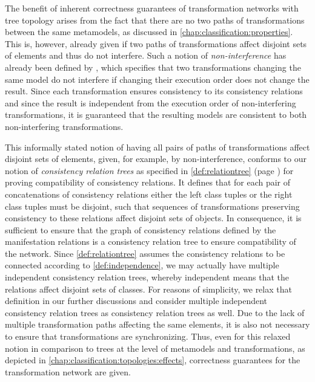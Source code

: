 The benefit of inherent correctness guarantees of transformation networks with tree topology arises from the fact that there are no two paths of transformations between the same metamodels, as discussed in \autoref{chap:classification:properties}.
This is, however, already given if two paths of transformations affect disjoint sets of elements and thus do not interfere.
Such a notion of \emph{non-interference} has already been defined by \textcite{stevens2020BidirectionalTransformationLarge-SoSym}, which specifies that two transformations changing the same model do not interfere if changing their execution order does not change the result.
Since each transformation ensures consistency to its consistency relations and since the result is independent from the execution order of non-interfering transformations, it is guaranteed that the resulting models are consistent to both non-interfering transformations.

This informally stated notion of having all pairs of paths of transformations affect disjoint sets of elements, given, for example, by non-interference, conforms to our notion of \emph{consistency relation trees} as specified in \autoref{def:relationtree} (page \pageref{def:relationtree}) for proving compatibility of consistency relations.
It defines that for each pair of concatenations of consistency relations either the left class tuples or the right class tuples must be disjoint, such that sequences of transformations preserving consistency to these relations affect disjoint sets of objects.
In consequence, it is sufficient to ensure that the graph of consistency relations defined by the manifestation relations is a consistency relation tree to ensure compatibility of the network.
Since \autoref{def:relationtree} assumes the consistency relations to be connected according to \autoref{def:independence}, we may actually have multiple independent consistency relation trees, whereby independent means that the relations affect disjoint sets of classes.
For reasons of simplicity, we relax that definition in our further discussions and consider multiple independent consistency relation trees as consistency relation trees as well.
Due to the lack of multiple transformation paths affecting the same elements, it is also not necessary to ensure that transformations are synchronizing.
Thus, even for this relaxed notion in comparison to trees at the level of metamodels and transformations, as depicted in \autoref{chap:classification:topologies:effects}, correctness guarantees for the transformation network are given.

